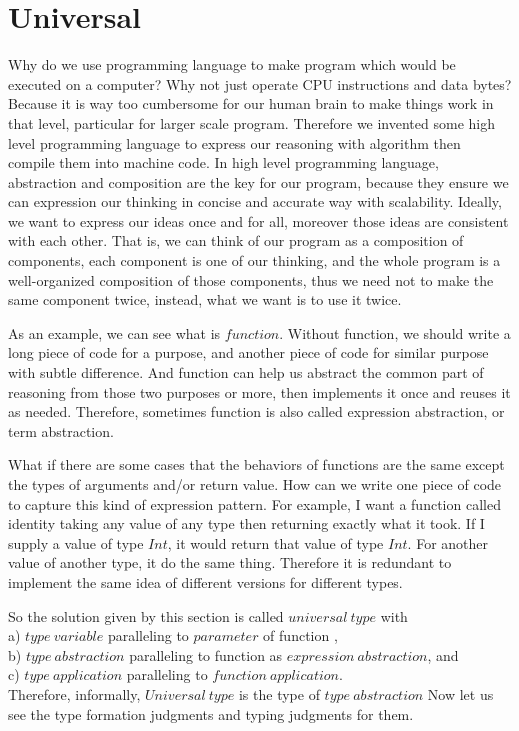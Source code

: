\documentclass{article}
\begin{document}
\section{Universal}
Why do we use programming language to make program which would be executed on a computer? Why not just operate CPU instructions and data bytes? Because it is way too cumbersome for our human brain to make things work in that level, particular for larger scale program. Therefore we invented some high level programming language to express our reasoning with algorithm then compile them into machine code. In high level programming language, abstraction and composition are the key for our program, because they ensure we can expression our thinking in concise and accurate way with scalability. Ideally, we want to express our ideas once and for all, moreover those ideas are consistent with each other. That is, we can think of our program as a composition of components, each component is one of our thinking, and the whole program is a well-organized composition of those components, thus we need not to make the same component twice, instead, what we want is to use it twice.


As an example, we can see what is $function$. Without function, we should write a long piece of code for a purpose, and another piece of code for similar purpose with subtle difference. And function can help us abstract the common part of reasoning from those two purposes or more, then implements it once and reuses it as needed. Therefore, sometimes function is also called expression abstraction, or term abstraction.


What if there are some cases that the behaviors of functions are the same except the types of arguments and/or return value. How can we write one piece of code to capture this kind of expression pattern. For example, I want a function called identity taking any value of any type then returning exactly what it took. If I supply a value of type $Int$, it would return that value of type $Int$. For another value of another type, it do the same thing. Therefore it is redundant to implement the same idea of different versions for different types.


So the solution given by this section is called $universal\ type$ with \\
a) $type\ variable$ paralleling to $parameter$ of function ,  \\
b) $type\ abstraction$ paralleling to function as $expression\ abstraction$, and \\
c) $type\ application$ paralleling to $function\ application$.\\
Therefore, informally, $Universal\ type$ is the type of $type\ abstraction$
Now let us see the type formation judgments and typing judgments for them.
\end{document}
